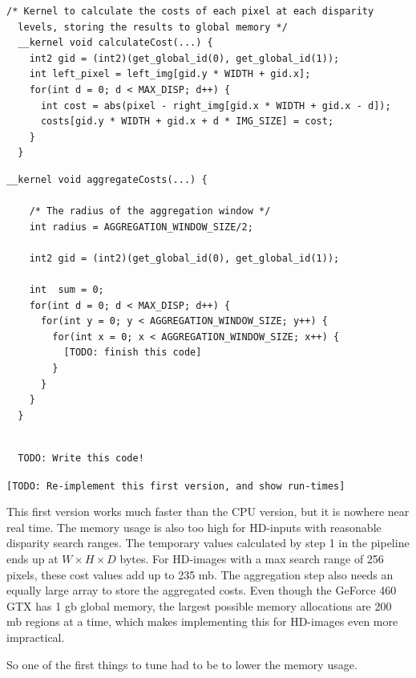 \begin{lstlisting}[label=calculateCosts,caption=Matching Cost kernel]
  /* Kernel to calculate the costs of each pixel at each disparity
  levels, storing the results to global memory */
  __kernel void calculateCost(...) {
    int2 gid = (int2)(get_global_id(0), get_global_id(1));
    int left_pixel = left_img[gid.y * WIDTH + gid.x];
    for(int d = 0; d < MAX_DISP; d++) {
      int cost = abs(pixel - right_img[gid.x * WIDTH + gid.x - d]);
      costs[gid.y * WIDTH + gid.x + d * IMG_SIZE] = cost;
    }
  }
\end{lstlisting}


\begin{lstlisting}[label=aggregateCosts,caption=Cost aggregation kernel]
  __kernel void aggregateCosts(...) {

    /* The radius of the aggregation window */
    int radius = AGGREGATION_WINDOW_SIZE/2;

    int2 gid = (int2)(get_global_id(0), get_global_id(1));

    int  sum = 0;
    for(int d = 0; d < MAX_DISP; d++) {
      for(int y = 0; y < AGGREGATION_WINDOW_SIZE; y++) {
        for(int x = 0; x < AGGREGATION_WINDOW_SIZE; x++) {
          [TODO: finish this code]
        }
      }
    }
  }
\end{lstlisting}


\begin{lstlisting}[label=disparitySelection, caption=Disparity
  selection kernel]

  TODO: Write this code!

\end{lstlisting}


\texttt{[TODO: Re-implement this first version, and show run-times]}

This first version works much faster than the CPU version, but it is
nowhere near real time. The memory usage is also too high for
HD-inputs with reasonable disparity search ranges. The temporary
values calculated by step 1 in the pipeline ends up at $ W \times H
\times D $ bytes. For HD-images with a max search range of 256 pixels,
these cost values add up to 235 mb. The aggregation step also needs an
equally large array to store the aggregated costs. Even though the
GeForce 460 GTX has 1 gb global memory, the largest possible memory
allocations are 200 mb regions at a time, which makes implementing
this for HD-images even more impractical.

So one of the first things to tune had to be to lower the memory
usage.


